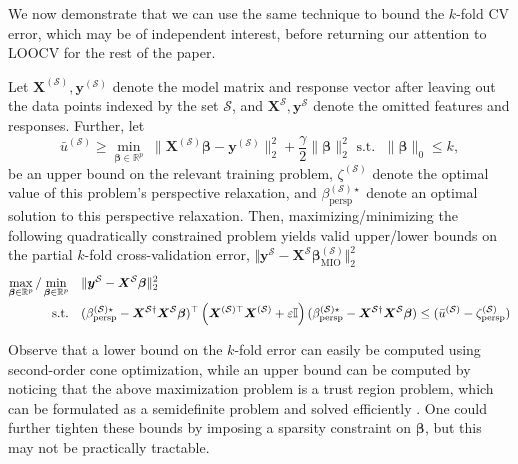 \documentclass[opre,nonblindrev]{informs3} %
\begin{document}
We now demonstrate that we can use the same technique to bound the $k$-fold CV error, which may be of independent interest, before returning our attention to LOOCV for the rest of the paper.
\begin{corollary}
Let $\bm{X}^{(\mathcal{S})}, \bm{y}^{(\mathcal{S})}$ denote the model matrix and response vector after leaving out the data points indexed by the set $\mathcal{S}$, and $\bm{X}^{\mathcal{S}}, \bm{y}^\mathcal{S}$ denote the omitted features and responses. Further, let 
$$	\bar u^{(\mathcal{S})}\geq \min_{\bm{\beta}\in \mathbb{R}^p}\; \|\bm{X}^{(\mathcal{S})}\bm{\beta}-\bm{y}^{(\mathcal{S})}\|_2^2+\frac{\gamma}{2}\|\bm{\beta}\|_2^2
\text{ s.t. }\; \|\bm{\beta}\|_0\leq k,$$
be an upper bound on the relevant training problem, $\zeta^{(\mathcal{S})}$ denote the optimal value of this problem's perspective relaxation, and $\beta_{\text{persp}}^{(\mathcal{S})\star}$ denote an optimal solution to this perspective relaxation. Then, maximizing/minimizing the following quadratically constrained problem yields valid upper/lower bounds on the partial $k$-fold cross-validation error, $\Vert \bm{y}^{\mathcal{S}}-\bm{X}^{\mathcal{S}}\bm{\beta}^{(\mathcal{S})}_{\text{MIO}}\Vert_2^2$
\begin{align*}
    \max_{\bm{\beta} \in \mathbb{R}^p}/\min_{\bm{\beta} \in \mathbb{R}^p} \quad & \Vert \bm{y}^{\mathcal{S}}-\bm{X}^{\mathcal{S}}\bm{\beta}\Vert_2^2\\
    \text{\rm s.t.} \quad & (\beta_{\text{persp}}^{(\mathcal{S})\star}- \bm{X}^{\mathcal{S}\dag} \bm{X}^{\mathcal{S}}\bm{\beta})^\top \left(\bm{X}^{(\mathcal{S})\top} \bm{X}^{(\mathcal{S})}+\varepsilon \mathbb{I}\right) (\beta_{\text{persp}}^{(\mathcal{S})\star}- \bm{X}^{\mathcal{S}\dag} \bm{X}^{\mathcal{S}}\bm{\beta}) \leq (\bar{u}^{(\mathcal{S})}-\zeta_{\text{persp}}^{(\mathcal{S})})
\end{align*}
\end{corollary}
\begin{remark}
Observe that a lower bound on the $k$-fold error can easily be computed using second-order cone optimization, while an upper bound can be computed by noticing that the above maximization problem is a trust region problem, which can be formulated as a semidefinite problem and solved efficiently \citep{hazan2016linear}. One could further tighten these bounds by imposing a sparsity constraint on $\bm{\beta}$, but this may not be practically tractable.
\end{remark}
\end{document}
